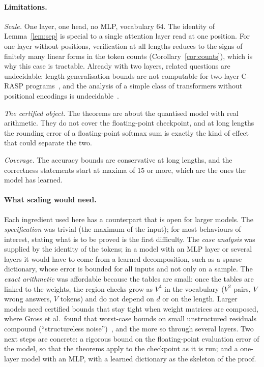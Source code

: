 \documentclass[11pt,a4paper]{article}
\begin{document}
\paragraph{Limitations.}
\emph{Scale.} One layer, one head, no MLP, vocabulary 64. The identity of
Lemma~\ref{lem:sep} is special to a single attention layer read at one position.
For one layer without positions, verification at all lengths reduces to the
signs of finitely many linear forms in the token counts
(Corollary~\ref{cor:counts}), which is why this case is tractable. Already with
two layers, related questions are undecidable: length-generalisation bounds are
not computable for two-layer C-RASP programs~\cite{yang2026bounds}, and the
analysis of a simple class of transformers without positional encodings is
undecidable~\cite{salzer2026counting}.

\emph{The certified object.} The theorems are about the quantised model with
real arithmetic. They do not cover the floating-point checkpoint, and at long
lengths the rounding error of a floating-point softmax sum is exactly the kind of
effect that could separate the two.

\emph{Coverage.} The accuracy bounds are conservative at long lengths, and the
correctness statements start at maxima of 15 or more, which are the ones the
model has learned.

\paragraph{What scaling would need.}
Each ingredient used here has a counterpart that is open for larger models. The
\emph{specification} was trivial (the maximum of the input); for most behaviours
of interest, stating what is to be proved is the first difficulty. The
\emph{case analysis} was supplied by the identity of the tokens; in a model with
an MLP layer or several layers it would have to come from a learned
decomposition, such as a sparse dictionary, whose error is bounded for all
inputs and not only on a sample. The \emph{exact arithmetic} was affordable
because the tables are small: once the tables are linked to the weights, the
region checks grow as $V^4$ in the vocabulary ($V^2$ pairs, $V$ wrong answers,
$V$ tokens) and do not depend on $d$ or on the length. Larger models need
certified bounds that stay tight when weight matrices are composed, where Gross
et al.\ found that worst-case bounds on small unstructured residuals compound
(``structureless noise'')~\cite{gross2024compact}, and the more so through
several layers. Two next steps are concrete: a rigorous bound on the
floating-point evaluation error of the model, so that the theorems apply to the
checkpoint as it is run; and a one-layer model with an MLP, with a learned
dictionary as the skeleton of the proof.
\end{document}
